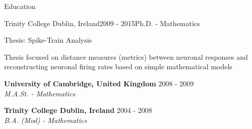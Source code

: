 \documentclass{resume} %
\begin{document}

\begin{rSection}{Education}
\begin{rSubsection}{Trinity College Dublin, Ireland}{2009 - 2015}{Ph.D. - Mathematics}{}
\item Thesis: Spike-Train Analysis
\item Thesis focused on distance measures (metrics) between neuronal responses and reconstructing neuronal firing rates based on simple mathematical models
\end{rSubsection}

{\bf University of Cambridge, United Kingdom} \hfill {2008 - 2009}\\
\emph{M.A.St. - Mathematics}

{\bf Trinity College Dublin, Ireland} \hfill {2004 - 2008}\\
\emph{B.A. (Mod) - Mathematics}


\end{rSection}
\end{document}
